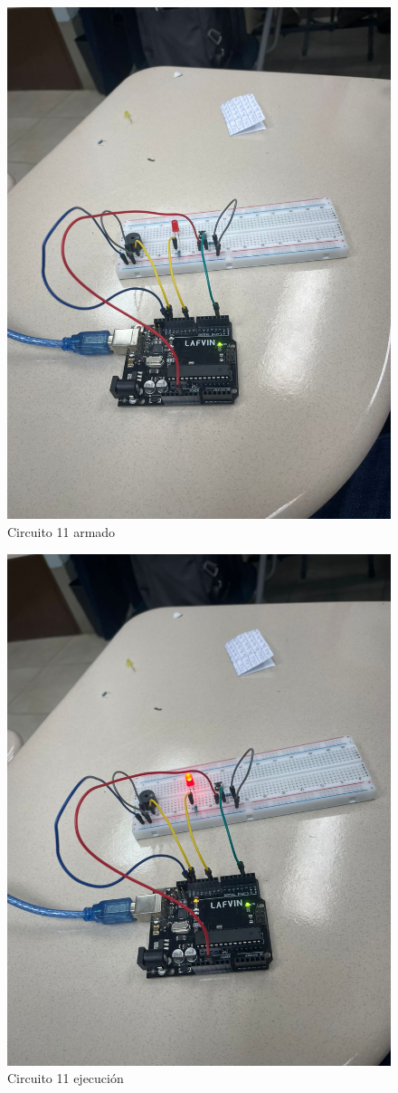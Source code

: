 \begin{figure}[H]
  \centering
  \includegraphics[scale = 0.3]{Imagenes/circDesarrollados/cd_11_circuito.jpg}
  \caption{Circuito 11 armado}
\end{figure}

\begin{figure}[H]
  \centering
  \includegraphics[scale = 0.3]{Imagenes/circDesarrollados/cd_11_ejecucion.jpg}
  \caption{Circuito 11 ejecución}
\end{figure}